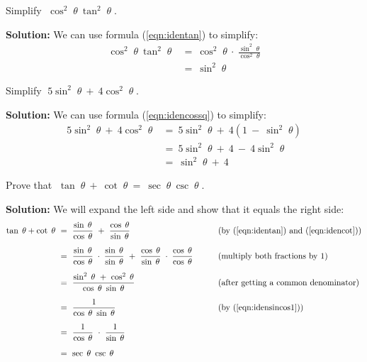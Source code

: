 \begin{exmp}
 Simplify $\;\cos^2 \;\theta ~ \tan^2 \;\theta\;$.\vspace{1mm}
 \par\noindent\textbf{Solution:} We can use formula (\ref{eqn:identan}) to simplify:
 \begin{align*}
  \cos^2 \;\theta~\tan^2 \;\theta ~ &= ~ \cos^2 \;\theta ~\cdot~
   \frac{\sin^2 \;\theta}{\cos^2 \;\theta}\\
  &= ~ \sin^2 \;\theta
 \end{align*}
\end{exmp}
\begin{exmp}
 Simplify $\;5\sin^2 \;\theta ~+~ 4\cos^2 \;\theta\;$.\vspace{1mm}
 \par\noindent\textbf{Solution:} We can use formula (\ref{eqn:idencossq}) to simplify:
 \begin{align*}
  5\sin^2 \;\theta ~+~ 4\cos^2 \;\theta ~ &= ~ 5\sin^2 \;\theta ~+~
   4\left( 1 ~-~ \sin^2 \;\theta \right)\\[1mm]
  &= ~ 5\sin^2 \;\theta ~+~ 4 ~-~ 4\sin^2 \;\theta\\[1mm]
  &= ~ \sin^2 \;\theta ~+~ 4
 \end{align*}
\end{exmp}\vspace{-2mm}
\divider
\newpage
\begin{exmp}
 Prove that $\;\tan \;\theta ~+~ \cot \;\theta ~=~ \sec \;\theta ~ \csc \;\theta\;$.\vspace{1mm}
 \par\noindent\textbf{Solution:} We will expand the left side and show that it equals the right side:
 \begin{alignat*}{3}
  \tan \;\theta + \cot \;\theta ~ &= ~ \frac{\sin\;\theta}{\cos\;\theta} ~+~
   \frac{\cos\;\theta}{\sin\;\theta} &{} \qquad &\text{(by (\ref{eqn:identan}) and
   (\ref{eqn:idencot}))}\\[2mm]
  &= ~ \frac{\sin\;\theta}{\cos\;\theta} \;\cdot\; \frac{\sin\;\theta}{\sin\;\theta} ~+~
   \frac{\cos\;\theta}{\sin\;\theta} \;\cdot\; \frac{\cos\;\theta}{\cos\;\theta}
   &{} \qquad &\text{(multiply both fractions by $1$)}\\[2mm]
  &= ~ \frac{\sin^2 \;\theta ~+~ \cos^2 \;\theta}{\cos\;\theta ~ \sin\;\theta} &{} \qquad
  &\text{(after getting a common denominator)}\\[2mm]
  &= ~ \frac{1}{\cos\;\theta ~ \sin\;\theta} &{} \qquad &\text{(by (\ref{eqn:idensincos1}))}\\[2mm]
  &= ~ \frac{1}{\cos\;\theta} ~\cdot~ \frac{1}{\sin\;\theta}\\[2mm]
  &= ~ \sec \;\theta ~ \csc \;\theta
 \end{alignat*}
\end{exmp}\vspace{-2mm}
\divider
\vspace{1mm}

